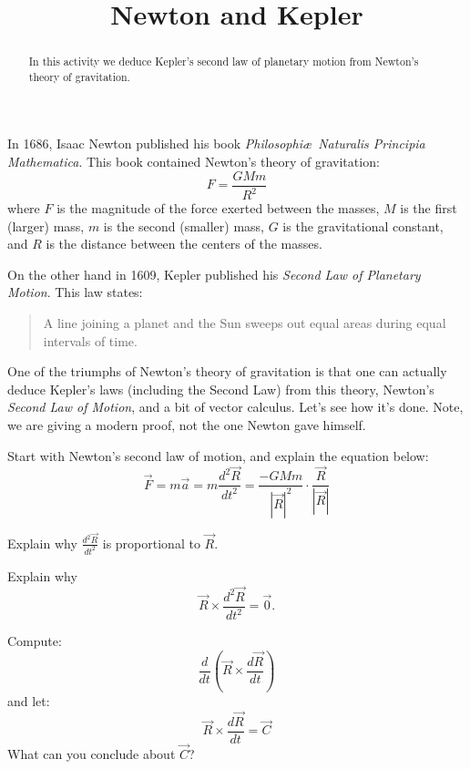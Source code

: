 \documentclass{ximera}
\title{Newton and Kepler}
\begin{document}
\begin{abstract}
In this activity we deduce Kepler's second law of planetary motion
from Newton's theory of gravitation.
\end{abstract}
\maketitle

In 1686, Isaac Newton published his book \textit{Philosophi\ae\
Naturalis Principia Mathematica}. This book contained Newton's theory
of gravitation:
\[
F = \frac{GMm}{R^2}
\] 
where $F$ is the magnitude of the force exerted between the masses, $M$ is the first (larger) mass, $m$ is the second (smaller) mass, $G$ is the gravitational constant, and $R$ is the distance between the centers of the masses. 

On the other hand in 1609, Kepler published his \textit{Second Law of
Planetary Motion}. This law states:
\begin{quote}
A line joining a planet and the Sun sweeps out equal areas during
equal intervals of time.
\end{quote}

One of the triumphs of Newton's theory of gravitation is that one can
actually deduce Kepler's laws (including the Second Law) from this
theory, Newton's \textit{Second Law of Motion}, and a bit of vector
calculus. Let's see how it's done. Note, we are giving a modern proof,
not the one Newton gave himself.

\begin{question}
Start with Newton's second law of motion, and explain the equation below:
\[
\vec{F} = m \vec{a} = m \frac{d^2\vec{R}}{dt^2} = \frac{-GMm}{|\vec{R}|^2}\cdot \frac{\vec{R}}{|\vec{R}|}
\]
\end{question}

\begin{question}
Explain why $\frac{d^2\vec{R}}{dt^2}$ is proportional to $\vec{R}$.
\end{question}

\begin{question}
Explain why 
\[
\vec{R} \times \frac{d^2\vec{R}}{dt^2} = \vec{0}.
\]
\end{question}

\begin{question}\label{Q:removeNaught}
Compute:
\[
\frac{d}{dt}\left(\vec{R}\times \frac{d\vec{R}}{dt}\right)
\]
and let:
\[
\vec{R}\times \frac{d\vec{R}}{dt}=\vec{C}
\]
What can you conclude about $\vec{C}$?
\end{question}
\end{document}
